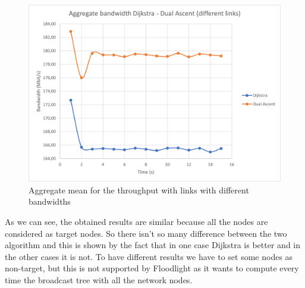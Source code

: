 \begin{figure}
	\centering
	\includegraphics[width=\textwidth]{img/aggregate-band-div.png}
	\caption{Aggregate mean for the throughput with links with different
	bandwidths}\label{fig:band-aggregate-div}
\end{figure}

As we can see, the obtained results are similar because all the nodes are
considered as target nodes. So there isn't so many difference between the two
algorithm and this is shown by the fact that in one case Dijkstra is better and
in the other cases it is not. To have different results we have to set some
nodes as non-target, but this is not supported by Floodlight as it wants to
compute every time the broadcast tree with all the network nodes.
